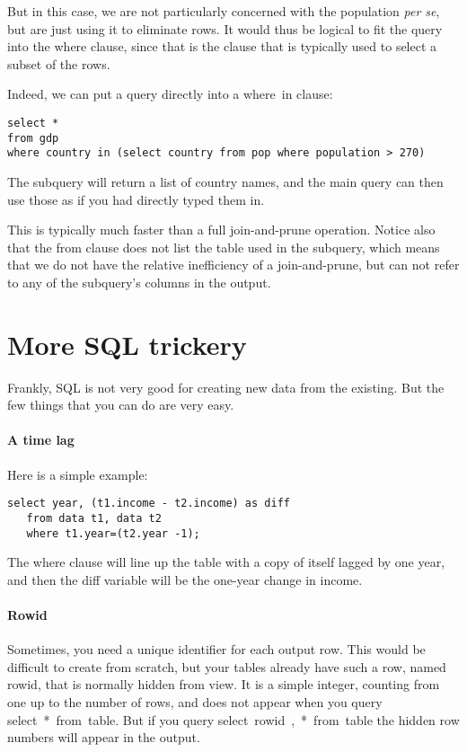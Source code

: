 
But in this case, we are not particularly concerned with the population
{\it per se}, but are just using it to eliminate rows. It would thus be
logical to fit the query into the \si{where} clause, since that is the
clause that is typically used to select a subset of the rows. 

Indeed, we can put a query directly into a \si{where ... in} clause:
\begin{lstlisting}
select * 
from gdp
where country in (select country from pop where population > 270)
\end{lstlisting}
The  subquery will return a list of country names, and the main query
can then use those as if you had directly typed them in.

This is typically much faster than a full join-and-prune operation.
Notice also that the \si{from} clause does not list the table used in
the subquery, which means that we do not have the relative inefficiency
of a join-and-prune, but can not refer to any of the subquery's columns
in the output.


\section{More SQL trickery} Frankly, SQL is not very good for
creating new data from the existing. But the few things that you can do
are very easy.

\paragraph{A time lag} Here is a simple example:
\begin{lstlisting}
select year, (t1.income - t2.income) as diff
   from data t1, data t2
   where t1.year=(t2.year -1);
\end{lstlisting}


The \si{where} clause will line up the table with a copy of itself
lagged by one year, and then the \si{diff} variable will be the
one-year change in income.


\paragraph{Rowid} Sometimes, you need a unique identifier for each
output row. This would be difficult to create from scratch, but your
tables already have such a row, named \si{rowid}, that is normally
hidden from view. It is a simple integer, counting from one up to the
number of rows, and does not appear when you query \si{select *
from table}. But if you query \si{select rowid, * from table}
the hidden row numbers will appear in the output.

